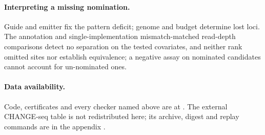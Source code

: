 \paragraph{Interpreting a missing nomination.}
Guide and emitter fix the pattern deficit; genome and budget determine lost loci. The annotation
and single-implementation mismatch-matched read-depth comparisons detect no separation on the
tested covariates, and neither rank omitted sites nor establish equivalence; a negative assay on
nominated candidates cannot account for un-nominated ones.

\paragraph{Data availability.} Code, certificates and every checker named above are at \repourl. The external CHANGE-seq table is not redistributed here; its archive, digest and replay commands are in the appendix \citep{zw4_reconciliation_2026}.
